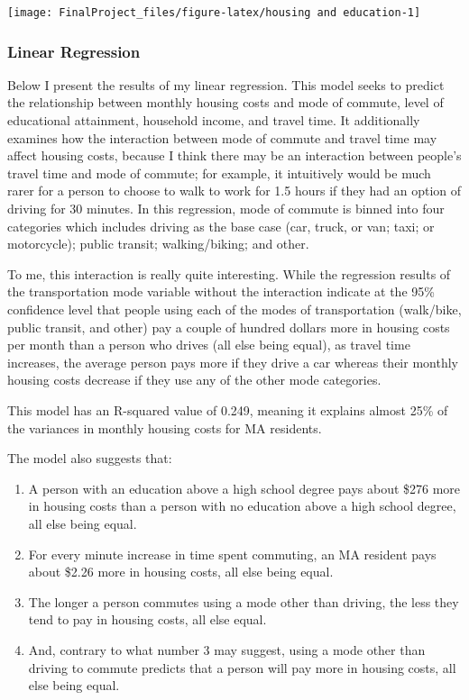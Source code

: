 \documentclass[
]{article}
\providecommand{\tightlist}{%
  \setlength{\itemsep}{0pt}\setlength{\parskip}{0pt}}
\begin{document}
\begin{center}\texttt{[image: FinalProject\_files/figure-latex/housing and education-1]} \end{center}

\hypertarget{linear-regression}{%
\subsubsection{Linear Regression}\label{linear-regression}}

Below I present the results of my linear regression. This model seeks to
predict the relationship between monthly housing costs and mode of
commute, level of educational attainment, household income, and travel
time. It additionally examines how the interaction between mode of
commute and travel time may affect housing costs, because I think there
may be an interaction between people's travel time and mode of commute;
for example, it intuitively would be much rarer for a person to choose
to walk to work for 1.5 hours if they had an option of driving for 30
minutes. In this regression, mode of commute is binned into four
categories which includes driving as the base case (car, truck, or van;
taxi; or motorcycle); public transit; walking/biking; and other.

To me, this interaction is really quite interesting. While the
regression results of the transportation mode variable without the
interaction indicate at the 95\% confidence level that people using each
of the modes of transportation (walk/bike, public transit, and other)
pay a couple of hundred dollars more in housing costs per month than a
person who drives (all else being equal), as travel time increases, the
average person pays more if they drive a car whereas their monthly
housing costs decrease if they use any of the other mode categories.

This model has an R-squared value of 0.249, meaning it explains almost
25\% of the variances in monthly housing costs for MA residents.

The model also suggests that:

\begin{enumerate}
\def\labelenumi{\arabic{enumi}.}
\tightlist
\item
  A person with an education above a high school degree pays about \$276
  more in housing costs than a person with no education above a high
  school degree, all else being equal.
\item
  For every minute increase in time spent commuting, an MA resident pays
  about \$2.26 more in housing costs, all else being equal.
\item
  The longer a person commutes using a mode other than driving, the less
  they tend to pay in housing costs, all else equal.
\item
  And, contrary to what number 3 may suggest, using a mode other than
  driving to commute predicts that a person will pay more in housing
  costs, all else being equal.
\end{enumerate}
\end{document}
